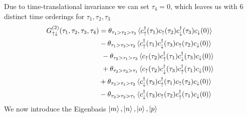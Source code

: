 \documentclass[12pt,a4paper]{scrartcl}
\numberwithin{equation}{section}
\begin{document}
Due to time-translational invariance we can set $\tau_4=0$, which leaves us with 
6 distinct time orderings for $\tau_1,\tau_2,\tau_3$
\begin{align}
G^{(2)}_{\uparrow \downarrow}(\tau_1,\tau_2,\tau_3,\tau_4)
&= \theta_{\tau_1 > \tau_2 > \tau_3}\braket{c^{\dagger}_{\uparrow}(\tau_1) c_{\uparrow}(\tau_2) c^{\dagger}_{\downarrow}(\tau_3) c_{\downarrow}(0)  } \nonumber\\
&- \theta_{\tau_1 > \tau_3 > \tau_2}\braket{c^{\dagger}_{\uparrow}(\tau_1) c^{\dagger}_{\downarrow}(\tau_3) c_{\uparrow}(\tau_2) c_{\downarrow}(0)  } \nonumber\\
%
&\ - \theta_{\tau_2 > \tau_1 > \tau_3}\braket{c_{\uparrow}(\tau_2) c^{\dagger}_{\uparrow}(\tau_1) c^{\dagger}_{\downarrow}(\tau_3) c_{\downarrow}(0)  } \nonumber\\
&\ + \theta_{\tau_2 > \tau_3 > \tau_1}\braket{c_{\uparrow}(\tau_2) c^{\dagger}_{\downarrow}(\tau_3) c^{\dagger}_{\uparrow}(\tau_1)  c_{\downarrow}(0)  } \nonumber\\
%
&+ \theta_{\tau_3 > \tau_1 > \tau_2 }\braket{c^{\dagger}_{\downarrow}(\tau_3) c^{\dagger}_{\uparrow}(\tau_1) c_{\uparrow}(\tau_2) c_{\downarrow}(0)  } \nonumber\\
&- \theta_{\tau_3 > \tau_2 > \tau_1 }\braket{c^{\dagger}_{\downarrow}(\tau_3) c_{\uparrow}(\tau_2) c^{\dagger}_{\uparrow}(\tau_1)  c_{\downarrow}(0)  } \nonumber\\
%
\end{align}
We now introduce the Eigenbasis $\ket{m},\ket{n},\ket{o},\ket{p}$ 
\end{document}
